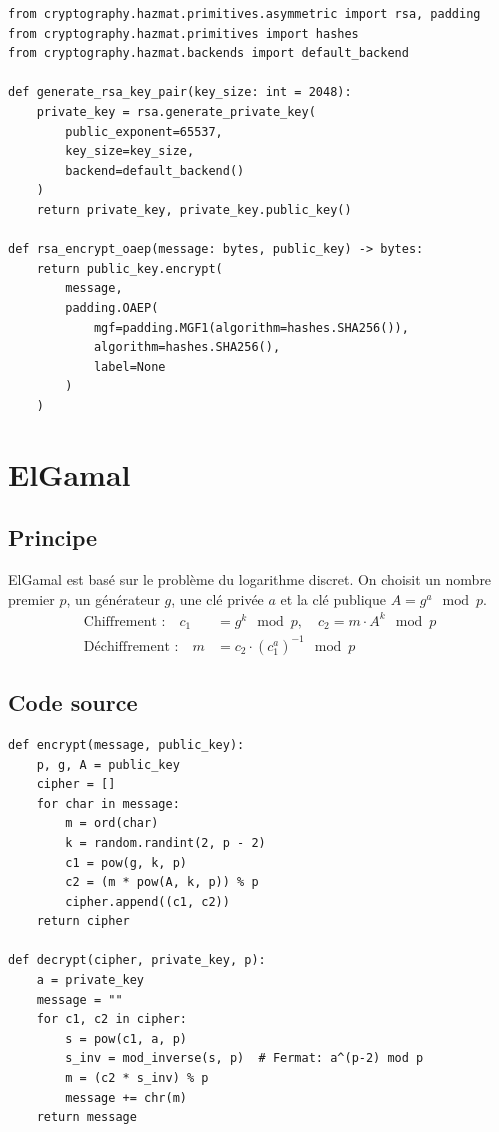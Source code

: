 \documentclass[12pt,a4paper]{report}
\begin{document}
\begin{lstlisting}[style=python,caption=RSA.py - Génération et Chiffrement OAEP]
from cryptography.hazmat.primitives.asymmetric import rsa, padding
from cryptography.hazmat.primitives import hashes
from cryptography.hazmat.backends import default_backend

def generate_rsa_key_pair(key_size: int = 2048):
    private_key = rsa.generate_private_key(
        public_exponent=65537,
        key_size=key_size,
        backend=default_backend()
    )
    return private_key, private_key.public_key()

def rsa_encrypt_oaep(message: bytes, public_key) -> bytes:
    return public_key.encrypt(
        message,
        padding.OAEP(
            mgf=padding.MGF1(algorithm=hashes.SHA256()),
            algorithm=hashes.SHA256(),
            label=None
        )
    )
\end{lstlisting}

\section{ElGamal}

\subsection{Principe}
ElGamal est basé sur le problème du logarithme discret. On choisit un nombre premier $p$, un générateur $g$, une clé privée $a$ et la clé publique $A = g^a \mod p$.
\begin{align}
\text{Chiffrement :} \quad c_1 &= g^k \mod p, \quad c_2 = m \cdot A^k \mod p \\
\text{Déchiffrement :} \quad m &= c_2 \cdot (c_1^a)^{-1} \mod p
\end{align}

\subsection{Code source}
\begin{lstlisting}[style=python,caption=ElGamal.py - Chiffrement/Dechiffrement]
def encrypt(message, public_key):
    p, g, A = public_key
    cipher = []
    for char in message:
        m = ord(char)
        k = random.randint(2, p - 2)
        c1 = pow(g, k, p)
        c2 = (m * pow(A, k, p)) % p
        cipher.append((c1, c2))
    return cipher

def decrypt(cipher, private_key, p):
    a = private_key
    message = ""
    for c1, c2 in cipher:
        s = pow(c1, a, p)
        s_inv = mod_inverse(s, p)  # Fermat: a^(p-2) mod p
        m = (c2 * s_inv) % p
        message += chr(m)
    return message
\end{lstlisting}
\end{document}
